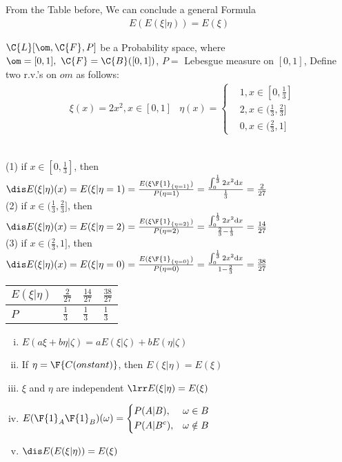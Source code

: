 \newpage
From the Table before, We can conclude a general Formula
\begin{align}
    E(E(\xi|\eta)) = E(\xi)
\end{align}


$\C{L}[\om, \C{F}, P]$ be a Probability space, where $\om = [0, 1],\ \C{F} = \C{B}([0, 1])$,
$P = $ Lebesgue measure on $[0, 1]$, Define two r.v.'s on $om$ as follows:
\begin{align*}
    &  \xi(x) = 2x^2, x \in [0, 1]
    & \eta(x) = 
    \left\{
        \begin{aligned}
            & 1, x\in [0, \frac{1}{3}]\\
            & 2, x\in (\frac13, \frac23]\\
            & 0, x\in (\frac23, 1]
        \end{aligned}
    \right.
\end{align*}

\\
(1) if $x\in [0, \frac13]$, then $\dis E(\xi|\eta)(x) = E(\xi|\eta=1) = \frac{E(\xi\F{1}_{\{\eta=1\}})}{P(\eta=1)} = \frac{\int_{0}^{\frac13}{2x^2 \mathrm{d}x}}{\frac13} = \frac{2}{27}$\\
(2) if $x\in (\frac13, \frac23]$, then $\dis E(\xi|\eta)(x) = E(\xi|\eta=2) = \frac{E(\xi\F{1}_{\{\eta=2\}})}{P(\eta=2)} = \frac{\int_{0}^{\frac13}{2x^2 \mathrm{d}x}}{\frac23-\frac13} = \frac{14}{27}$\\
(3) if $x\in (\frac23, 1]$, then $\dis E(\xi|\eta)(x) = E(\xi|\eta=0) = \frac{E(\xi\F{1}_{\{\eta=0\}})}{P(\eta=0)} = \frac{\int_{0}^{\frac13}{2x^2 \mathrm{d}x}}{1-\frac23} = \frac{38}{27}$

\begin{center}
    \begin{tabular}{p{6em}|p{6em}p{6em}p{6em}}
        $E(\xi|\eta)$ & $\frac{2}{27}$ & $\frac{14}{27}$ & $\frac{38}{27}$ \\
        \hline
        $P$ & $\frac13$ & $\frac13$ & $\frac13$\\  
    \end{tabular} 
\end{center}


\begin{enumerate}[(i)]
    \item $E(a\xi+b\eta|\zeta) = aE(\xi|\zeta)+bE(\eta|\zeta)$
    \item If $\eta = \F{C(onstant)}$, then $E(\xi|\eta) = E(\xi)$
    \item $\xi$ and $\eta$ are independent $\lrr E(\xi|\eta) = E(\xi)$
    \item $E(\F{1}_A\F{1}_B)(\omega) = 
        \left\{
            \begin{aligned}
                & P(A|B),&\omega\in B\\
                & P(A|B^c), &\omega \notin B
            \end{aligned}
        \right.
    $
    \item $\dis E(E(\xi|\eta)) = E(\xi)$
\end{enumerate}

